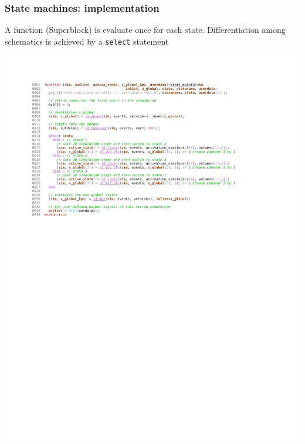 \documentclass[serif,9pt,xcolor=dvipsnames]{beamer}
\begin{document}
\begin{frame}
  \frametitle{State machines: implementation}

A function (Superblock) is evaluate once for each state. Differentiation among schematics is achieved by a \texttt{select} statement
  

\centering \includegraphics[trim=2.7cm 9.5cm 4cm 1.4cm, clip, width=1.0\linewidth]{figures/state_mainfn.pdf} 

\end{frame}
\end{document}
